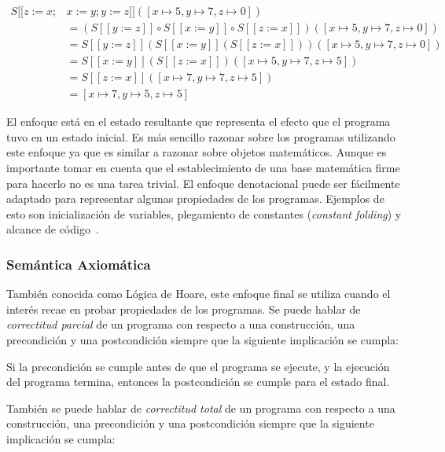 \begin{align*}
S [\![ z:=x; & x:=y; y:=z ]\!]([x\mapsto5, y\mapsto7, z\mapsto0])\\
&= (S [\![ y:=z ]\!] \circ S [\![ x:=y ]\!] \circ S [\![ z:=x ]\!])([x\mapsto5, y\mapsto7, z\mapsto0])\\
&= S [\![ y:=z ]\!](S [\![ x:=y ]\!] (S [\![ z:=x ]\!]))([x\mapsto5, y\mapsto7, z\mapsto0])\\
&= S [\![ x:=y ]\!] (S [\![ z:=x ]\!])([x\mapsto5, y\mapsto7, z\mapsto5])\\
&= S [\![ z:=x ]\!]([x\mapsto7, y\mapsto7, z\mapsto5])\\
&= [x\mapsto7, y\mapsto5, z\mapsto5]
\end{align*}

El enfoque está en el estado resultante que representa el efecto que el programa tuvo en un estado inicial.
Es más sencillo razonar sobre los programas utilizando este enfoque ya que es similar a razonar sobre objetos matemáticos.
Aunque es importante tomar en cuenta que el establecimiento de una base matemática firme para hacerlo no es una tarea trivial.
El enfoque denotacional puede ser fácilmente adaptado para representar algunas propiedades de los programas.
Ejemplos de esto son inicialización de variables, plegamiento de constantes (\textit{constant folding}) y alcance de código~\citep{nielson}.


\subsubsection*{Semántica Axiomática}

\begin{comment}
FIXME construcción
\end{comment}
También conocida como Lógica de Hoare, este enfoque final se utiliza cuando el interés recae en probar propiedades de los programas.
Se puede hablar de \textit{correctitud parcial} de un programa con respecto a una construcción, una precondición y una postcondición siempre que la siguiente implicación se cumpla:

\begin{displayquote}
Si la precondición se cumple antes de que el programa se ejecute, y la ejecución del programa termina, entonces la postcondición se cumple para el estado final.
\end{displayquote}

También se puede hablar de \textit{correctitud total} de un programa con respecto a una construcción, una precondición y una postcondición siempre que la siguiente implicación se cumpla:

